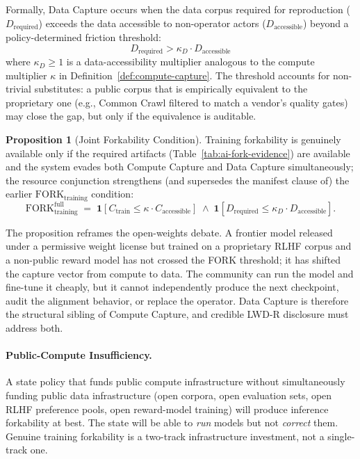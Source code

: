 \documentclass{article}
\theoremstyle{definition}
\newtheorem{proposition}{Proposition}[section]
\begin{document}
Formally, Data Capture occurs when the data corpus required for reproduction ($D_{\text{required}}$) exceeds the data accessible to non-operator actors ($D_{\text{accessible}}$) beyond a policy-determined friction threshold:
\begin{equation}
D_{\text{required}} > \kappa_D \cdot D_{\text{accessible}}
\end{equation}
where $\kappa_D \geq 1$ is a data-accessibility multiplier analogous to the compute multiplier $\kappa$ in Definition~\ref{def:compute-capture}. The threshold accounts for non-trivial substitutes: a public corpus that is empirically equivalent to the proprietary one (e.g., Common Crawl filtered to match a vendor's quality gates) may close the gap, but only if the equivalence is auditable.

\begin{proposition}[Joint Forkability Condition]
\label{prop:joint-forkability}
Training forkability is genuinely available only if the required artifacts (Table~\ref{tab:ai-fork-evidence}) are available and the system evades both Compute Capture and Data Capture simultaneously; the resource conjunction strengthens (and supersedes the manifest clause of) the earlier $\text{FORK}_{\text{training}}$ condition:
\[
\text{FORK}_{\text{training}}^{\text{full}} \;=\; \mathbf{1}[C_{\text{train}} \leq \kappa \cdot C_{\text{accessible}}] \;\land\; \mathbf{1}[D_{\text{required}} \leq \kappa_D \cdot D_{\text{accessible}}].
\]
\end{proposition}

The proposition reframes the open-weights debate. A frontier model released under a permissive weight license but trained on a proprietary RLHF corpus and a non-public reward model has not crossed the FORK threshold; it has shifted the capture vector from compute to data. The community can run the model and fine-tune it cheaply, but it cannot independently produce the next checkpoint, audit the alignment behavior, or replace the operator. Data Capture is therefore the structural sibling of Compute Capture, and credible LWD-R disclosure must address both.

\paragraph{Public-Compute Insufficiency.} A state policy that funds public compute infrastructure without simultaneously funding public data infrastructure (open corpora, open evaluation sets, open RLHF preference pools, open reward-model training) will produce inference forkability at best. The state will be able to \emph{run} models but not \emph{correct} them. Genuine training forkability is a two-track infrastructure investment, not a single-track one.
\end{document}
